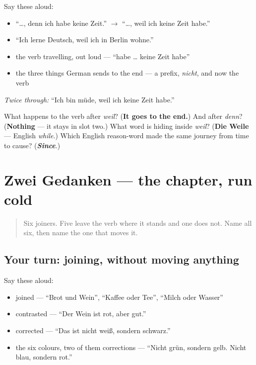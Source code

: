 Say these aloud:

\begin{itemize}
\raggedright
  \item \textquotedblleft{}…, denn ich habe keine Zeit.\textquotedblright{} $\to$ \textquotedblleft{}…, weil ich keine Zeit habe.\textquotedblright{}
  \item \textquotedblleft{}Ich lerne Deutsch, weil ich in Berlin wohne.\textquotedblright{}
  \item the verb travelling, out loud — \textquotedblleft{}habe … keine Zeit habe\textquotedblright{}
  \item the three things German sends to the end — a prefix, \emph{nicht}, and now the verb
\end{itemize}

\emph{Twice through:} \textquotedblleft{}Ich bin müde, weil ich keine Zeit habe.\textquotedblright{}

\begin{tcolorbox}[breakable,colback=teal!4,colframe=teal!35!black,title={Before you move on}]
What happens to the verb after \emph{weil}? (\textbf{It goes to the end.}) And after \emph{denn}? (\textbf{Nothing} — it stays in slot two.) What word is hiding inside \emph{weil}? (\textbf{Die Weile} — English \emph{while}.) Which English reason-word made the same journey from time to cause? (\emph{\textbf{Since}}.)
\end{tcolorbox}
\section[Practice]{Zwei Gedanken — the chapter, run cold}

\label{lesson:GE-R35-zwei-gedanken}



\begin{quote}
Six joiners. Five leave the verb where it stands and one does not. Name all six, then name the one that moves it.
\end{quote}

\subsection*{Your turn: joining, without moving anything}
Say these aloud:

\begin{itemize}
\raggedright
  \item joined — \textquotedblleft{}Brot und Wein\textquotedblright{}, \textquotedblleft{}Kaffee oder Tee\textquotedblright{}, \textquotedblleft{}Milch oder Wasser\textquotedblright{}
  \item contrasted — \textquotedblleft{}Der Wein ist rot, aber gut.\textquotedblright{}
  \item corrected — \textquotedblleft{}Das ist nicht weiß, sondern schwarz.\textquotedblright{}
  \item the six colours, two of them corrections — \textquotedblleft{}Nicht grün, sondern gelb. Nicht blau, sondern rot.\textquotedblright{}
\end{itemize}

